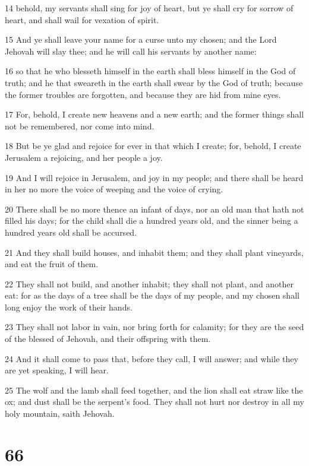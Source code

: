 \par 14 behold, my servants shall sing for joy of heart, but ye shall cry for sorrow of heart, and shall wail for vexation of spirit.
\par 15 And ye shall leave your name for a curse unto my chosen; and the Lord Jehovah will slay thee; and he will call his servants by another name:
\par 16 so that he who blesseth himself in the earth shall bless himself in the God of truth; and he that sweareth in the earth shall swear by the God of truth; because the former troubles are forgotten, and because they are hid from mine eyes.
\par 17 For, behold, I create new heavens and a new earth; and the former things shall not be remembered, nor come into mind.
\par 18 But be ye glad and rejoice for ever in that which I create; for, behold, I create Jerusalem a rejoicing, and her people a joy.
\par 19 And I will rejoice in Jerusalem, and joy in my people; and there shall be heard in her no more the voice of weeping and the voice of crying.
\par 20 There shall be no more thence an infant of days, nor an old man that hath not filled his days; for the child shall die a hundred years old, and the sinner being a hundred years old shall be accursed.
\par 21 And they shall build houses, and inhabit them; and they shall plant vineyards, and eat the fruit of them.
\par 22 They shall not build, and another inhabit; they shall not plant, and another eat: for as the days of a tree shall be the days of my people, and my chosen shall long enjoy the work of their hands.
\par 23 They shall not labor in vain, nor bring forth for calamity; for they are the seed of the blessed of Jehovah, and their offspring with them.
\par 24 And it shall come to pass that, before they call, I will answer; and while they are yet speaking, I will hear.
\par 25 The wolf and the lamb shall feed together, and the lion shall eat straw like the ox; and dust shall be the serpent's food. They shall not hurt nor destroy in all my holy mountain, saith Jehovah.

\chapter{66}

